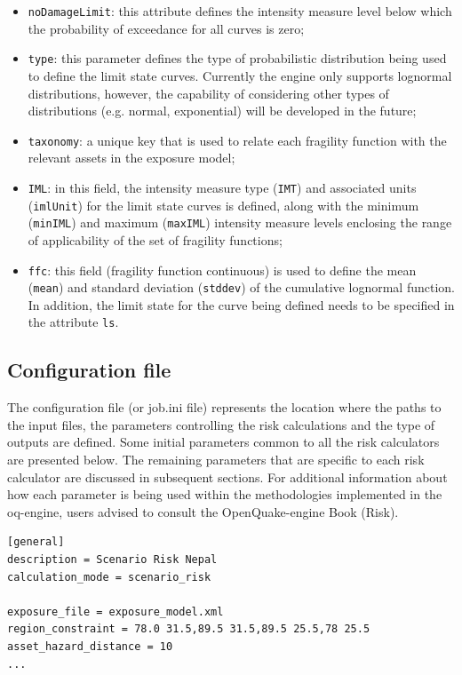 \begin{itemize}
\item  \Verb+noDamageLimit+: this attribute defines the intensity measure level below which the probability of exceedance for all curves is zero;
\item  \Verb+type+: this parameter defines the type of probabilistic distribution being used to define the limit state curves. Currently the engine only supports lognormal distributions, however, the capability of considering other types of distributions (e.g. normal, exponential) will be developed in the future;
\item  \Verb+taxonomy+: a unique key that is used to relate each \gls{fragility function} with the relevant \glspl{asset} in the \gls{exposure model};
\item  \Verb+IML+: in this field, the intensity measure type (\Verb+IMT+) and associated units (\Verb+imlUnit+) for the limit state curves is defined, along with the minimum (\Verb+minIML+) and maximum (\Verb+maxIML+) intensity measure levels enclosing the range of applicability of the set of fragility functions;
\item  \Verb+ffc+: this field (fragility function continuous) is used to define the mean (\Verb+mean+) and standard deviation (\Verb+stddev+) of the cumulative lognormal function. In addition, the limit state for the curve being defined needs to be specified in the attribute \Verb+ls+.
\end{itemize}

\subsection{Configuration file}
The configuration file (or job.ini file) represents the location where the paths to the input files, the parameters controlling the risk calculations and the type of outputs are defined. Some initial parameters common to all the risk calculators are presented below. The remaining parameters that are specific to each risk calculator are discussed in subsequent sections. For additional information about how each parameter is being used within the methodologies implemented in the oq-engine, users advised to consult the OpenQuake-engine Book (Risk).

\begin{Verbatim}[frame=single, commandchars=\\\{\}, samepage=true]
[general]
description = Scenario Risk Nepal
calculation_mode = scenario_risk

exposure_file = exposure_model.xml
region_constraint = 78.0 31.5,89.5 31.5,89.5 25.5,78 25.5
asset_hazard_distance = 10
...
\end{Verbatim}

